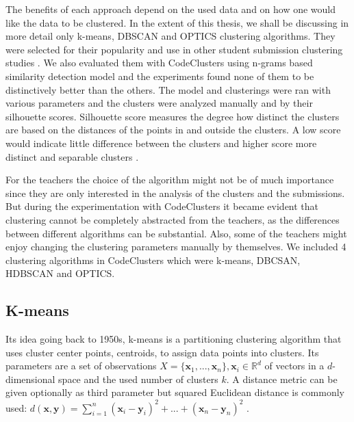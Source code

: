 The benefits of each approach depend on the used data and on how one would like the data to be clustered. In the extent of this thesis, we shall be discussing in more detail only k-means, DBSCAN and OPTICS clustering algorithms. They were selected for their popularity and use in other student submission clustering studies \cite{divide-and-correct, fox-clust-leverage-2015, glass-feature-engineering, fox-roy-autostyle-msc-2016}. We also evaluated them with CodeClusters using n-grams based similarity detection model and the experiments found none of them to be distinctively better than the others. The model and clusterings were ran with various parameters and the clusters were analyzed manually and by their silhouette scores. Silhouette score measures the degree how distinct the clusters are based on the distances of the points in and outside the clusters. A low score would indicate little difference between the clusters and higher score more distinct and separable clusters \cite{fox-clust-leverage-2015}.

For the teachers the choice of the algorithm might not be of much importance since they are only interested in the analysis of the clusters and the submissions. But during the experimentation with CodeClusters it became evident that clustering cannot be completely abstracted from the teachers, as the differences between different algorithms can be substantial. Also, some of the teachers might enjoy changing the clustering parameters manually by themselves. We included 4 clustering algorithms in CodeClusters which were k-means, DBCSAN, HDBSCAN and OPTICS.

\subsection{K-means}
\label{ssec:kmeans}

Its idea going back to 1950s, k-means is a partitioning clustering algorithm that uses cluster center points, centroids, to assign data points into clusters. Its parameters are a set of observations $X=\{\mathbf{x}_1, ..., \mathbf{x}_n\}, \mathbf{x}_i \in \mathbb{R}^d$ of vectors in a $d$-dimensional space and the used number of clusters $k$. A distance metric can be given optionally as third parameter but squared Euclidean distance is commonly used: $d(\mathbf{x}, \mathbf{y})=\sum^{n}_{i=1} (\mathbf{x}_i - \mathbf{y}_i)^2 + ... + (\mathbf{x}_n - \mathbf{y}_n)^2$ \cite{islr-2014, jain-50y-kmeans-2010}.

